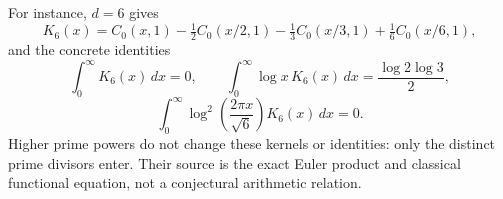For instance, $d=6$ gives
\[
 K_6(x)=C_0(x,1)-\tfrac12C_0(x/2,1)
                    -\tfrac13C_0(x/3,1)+\tfrac16C_0(x/6,1),
\]
and the concrete identities
\[
 \int_0^\infty K_6(x)\,dx=0,\qquad
 \int_0^\infty\log x\,K_6(x)\,dx=\frac{\log2\log3}{2},
\]
\[
 \int_0^\infty
       \log^2\!\left(\frac{2\pi x}{\sqrt6}\right)K_6(x)\,dx=0.
\]
Higher prime powers do not change these kernels or identities: only the
distinct prime divisors enter. Their source is the exact Euler product
and classical functional equation, not a conjectural arithmetic relation.
